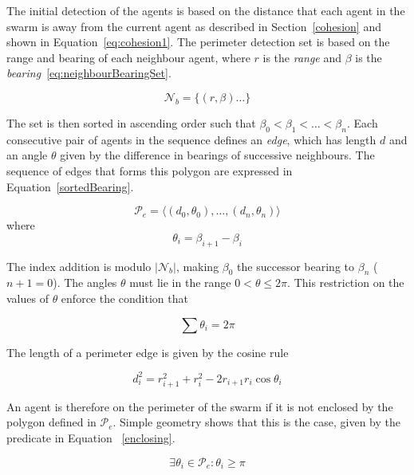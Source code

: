\documentclass[12pt,a4paper]{IEEEtran}
\begin{document}
The initial detection of the agents is based on the distance that each agent in the swarm is away from the current agent as described in Section~\ref{cohesion} and shown in Equation~\ref{eq:cohesion1}. The perimeter detection set is based on the range and bearing of each neighbour agent, where $r$ is the \textit{range} and $\beta$ is the \textit{bearing}~\ref{eq:neighbourBearingSet}.

\begin{equation}\label{eq:neighbourBearingSet}
\mathcal{N}_b = \{ (r,\beta) \ldots \} 
\end{equation}

The set is then sorted in ascending order such that $\beta_0 < \beta_1 < \ldots < \beta_n$. Each consecutive pair of agents in the sequence defines an \textit{edge}, which has length $d$ and an angle $\theta$ given by the difference in bearings of successive neighbours. The sequence of edges that forms this polygon are expressed in Equation~\ref{sortedBearing}.

\begin{equation}\label{sortedBearing}
\mathcal{P}_e = \langle (d_0,\theta_0), \ldots , (d_n,\theta_n) \rangle
\end{equation}
where
\begin{equation}
\theta_i = \beta_{i+1} - \beta_i
\end{equation}

The index addition is modulo $|\mathcal N_b|$, making $\beta_0$ the successor bearing to $\beta_n$ ($n+1 = 0$).  The angles $\theta$ must lie in the range $0<\theta\leq2\pi$. This restriction on the values of $\theta$ enforce the condition that

\begin{equation}
\sum\theta_i = 2\pi
\end{equation}

The length of a perimeter edge is given by the cosine rule

\begin{equation}
d_i^2 = r_{i+1}^2 + r_i^2 -2r_{i+1}r_i \cos\theta_i
\end{equation}

An agent is therefore on the perimeter of the swarm if it is not enclosed by the polygon defined in $\mathcal{P}_e$.  Simple geometry shows that this is the case, given by the predicate in Equation ~\ref{enclosing}.

\begin{equation}
\exists \theta_i \in \mathcal{P}_e : \theta_i\geq\pi
\label{enclosing}
\end{equation}
\end{document}
